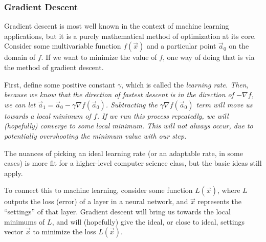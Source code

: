 \subsubsection{Gradient Descent}
Gradient descent is most well known in the context of machine learning applications, but it is a purely mathematical method of optimization at its core. Consider some multivariable function \(f(\vec x)\) and a particular point \(\vec a_0\) on the domain of \(f\). If we want to minimize the value of \(f\), one way of doing that is via the method of gradient descent. \par First, define some positive constant \(\gamma\), which is called the \it{learning rate}. Then, because we know that the direction of fastest descent is in the direction of \(-\nabla f\), we can let \(\vec a_1 = \vec a_0 - \gamma \nabla f(\vec a_0)\). Subtracting the \(\gamma \nabla f(\vec a_0)\) term will move us towards a local minimum of \(f\). If we run this process repeatedly, we will (hopefully) converge to some local minimum. This will not always occur, due to potentially overshooting the minimum value with our step. \par The nuances of picking an ideal learning rate (or an adaptable rate, in some cases) is more fit for a higher-level computer science class, but the basic ideas still apply.\par To connect this to machine learning, consider some function \(L(\vec x)\), where \(L\) outputs the loss (error) of a layer in a neural network, and \(\vec x\) represents the ``settings'' of that layer. Gradient descent will bring us towards the local minimums of \(L\), and will (hopefully) give the ideal, or close to ideal, settings vector \(\vec x\) to minimize the loss \(L(\vec x)\).
